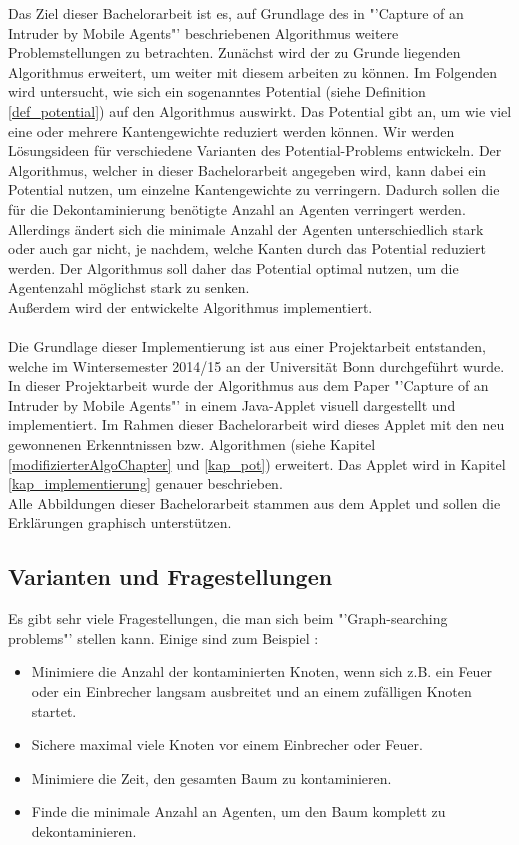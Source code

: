 Das Ziel dieser Bachelorarbeit ist es, auf Grundlage des in "'Capture of an Intruder by Mobile Agents"' \cite{cima_paper} beschriebenen Algorithmus weitere Problemstellungen zu betrachten. Zunächst wird der zu Grunde liegenden Algorithmus erweitert, um weiter mit diesem arbeiten zu können. Im Folgenden wird untersucht, wie sich ein sogenanntes Potential (siehe Definition \ref{def_potential}) auf den Algorithmus auswirkt. Das Potential gibt an, um wie viel eine oder mehrere Kantengewichte reduziert werden können. Wir werden Lösungsideen für verschiedene Varianten des Potential-Problems entwickeln. Der Algorithmus, welcher in dieser Bachelorarbeit angegeben wird, kann dabei ein Potential nutzen, um einzelne Kantengewichte zu verringern. Dadurch sollen die für die Dekontaminierung benötigte Anzahl an Agenten verringert werden. Allerdings ändert sich die minimale Anzahl der Agenten unterschiedlich stark oder auch gar nicht, je nachdem, welche Kanten durch das Potential reduziert werden. Der Algorithmus soll daher das Potential optimal nutzen, um die Agentenzahl möglichst stark zu senken.\\
Außerdem wird der entwickelte Algorithmus implementiert.
\\
\\
Die Grundlage dieser Implementierung ist aus einer Projektarbeit entstanden, welche im Wintersemester 2014/15 an der Universität Bonn durchgeführt wurde.
In dieser Projektarbeit wurde der Algorithmus aus dem Paper "'Capture of an Intruder by Mobile Agents"' \cite{cima_paper} in einem Java-Applet visuell dargestellt und implementiert. Im Rahmen dieser Bachelorarbeit wird dieses Applet mit den neu gewonnenen Erkenntnissen bzw. Algorithmen (siehe Kapitel \ref{modifizierterAlgoChapter} und \ref{kap_pot}) erweitert. Das Applet wird in Kapitel \ref{kap_implementierung} genauer beschrieben.\\
Alle Abbildungen dieser Bachelorarbeit stammen aus dem Applet und sollen die Erklärungen graphisch unterstützen.



\subsection{Varianten und Fragestellungen}


Es gibt sehr viele Fragestellungen, die man sich beim "'Graph-searching problems"' stellen kann. Einige sind zum Beispiel \cite{firefighterproblem_paper}:
\begin{itemize}
	\item Minimiere die Anzahl der kontaminierten Knoten, wenn sich z.B. ein Feuer oder ein Einbrecher langsam ausbreitet und an einem zufälligen Knoten startet.
	\item Sichere maximal viele Knoten vor einem Einbrecher oder Feuer.
	\item Minimiere die Zeit, den gesamten Baum zu kontaminieren.
	\item Finde die minimale Anzahl an  Agenten, um den Baum komplett zu dekontaminieren.
\end{itemize}

